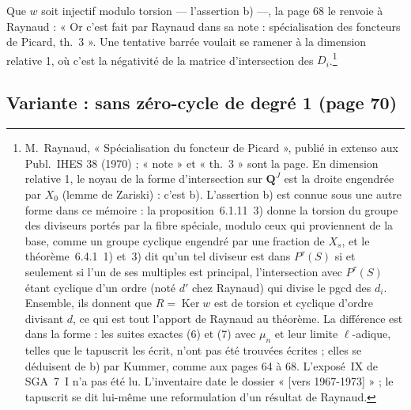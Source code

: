 \documentclass[11pt,a4paper]{article}
\begin{document}
Que $w$ soit injectif modulo torsion --- l'assertion b) ---, la page 68 le renvoie
à Raynaud : « Or c'est fait par Raynaud dans sa note : spécialisation des
foncteurs de Picard, th.~3 ». Une tentative barrée voulait se ramener à la
dimension relative 1, où c'est la négativité de la matrice d'intersection des
$D_i$.\footnote{M.~Raynaud, « Spécialisation du foncteur de Picard », publié in
extenso aux Publ.\ IHES 38 (1970) ; « note » et « th.~3 » sont la page. En
dimension relative 1, le noyau de la forme d'intersection sur $\mathbf{Q}^J$ est
la droite engendrée par $X_0$ (lemme de Zariski) : c'est b). L'assertion b)
est connue sous une autre forme dans ce mémoire : la proposition~6.1.11~3)
donne la torsion du groupe des diviseurs portés par la fibre spéciale, modulo
ceux qui proviennent de la base, comme un groupe cyclique engendré par une
fraction de $X_s$, et le théorème~6.4.1~1) et~3) dit qu'un tel diviseur est
dans $P^{\tau}(S)$ si et seulement si l'un de ses multiples est principal,
l'intersection avec $P^{\tau}(S)$ étant cyclique d'un ordre (noté $d'$ chez
Raynaud) qui divise le pgcd des $d_i$. Ensemble, ils donnent que $R =
\operatorname{Ker} w$ est de torsion et cyclique d'ordre divisant $d$, ce qui
est tout l'apport de Raynaud au théorème. La différence est dans la forme :
les suites exactes (6) et (7) avec $\mu_n$ et leur limite $\ell$-adique, telles
que le tapuscrit les écrit, n'ont pas été trouvées écrites ; elles se déduisent
de b) par Kummer, comme aux pages 64 à 68. L'exposé~IX de SGA~7~I n'a pas été
lu. L'inventaire date le dossier « [vers 1967-1973] » ; le tapuscrit se dit
lui-même une reformulation d'un résultat de Raynaud.}

\subsection*{Variante : sans zéro-cycle de degré 1 (page 70)}
\end{document}
